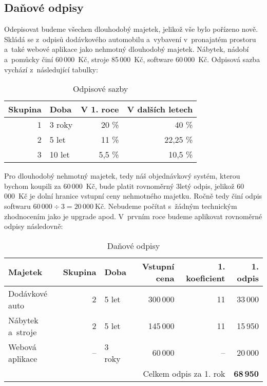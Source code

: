 \subsection{Daňové odpisy}
Odepisovat budeme všechen dlouhodobý majetek, jelikož vše bylo pořízeno nově. Skládá se z~odpisů dodávkového automobilu a~vybavení v~pronajatém prostoru a~také webové aplikace jako nehmotný dlouhodobý majetek. Nábytek, nádobí a~pomůcky činí 60\,000~Kč, stroje 85\,000~Kč, software 60\,000~Kč. Odpisová sazba vychází z~následující tabulky:

\begin{table}[htbp]
\begin{center}
\begin{tabular}{ r l r r }
\textbf{Skupina} & \textbf{Doba} & \textbf{V 1. roce} & \textbf{V dalších letech} \\ \hline
1                & 3 roky        & 20 \%              & 40 \%                     \\ 
2                & 5 let         & 11 \%              & 22,25 \%                  \\
3                & 10 let        & 5,5 \%             & 10,5 \%                    
\end{tabular}
\caption{Odpisové sazby \cite{andrejs}}
\label{odpisove_sazby}
\end{center}
\end{table}

Pro dlouhodobý nehmotný majetek, tedy náš objednávkový systém, kterou bychom koupili za 60\,000~Kč, bude platit rovnoměrný 3letý odpis, jelikož 60\,000~Kč je dolní hranice vstupní ceny nehmotného majetku. Ročně tedy činí odpis softwaru $60\,000 \div 3 = 20\,000~\text{Kč}$. Nebudeme počítat s~žádným technickým zhodnocením jako je upgrade apod. V~prvním roce budeme aplikovat rovnoměrné odpisy následovně:

\begin{table}[htbp]
\begin{center}
\begin{tabular}{lrlrrr}
\textbf{Majetek} & \textbf{Skupina}     & \textbf{Doba} & \textbf{Vstupní cena} & \textbf{1. koeficient}               & \textbf{1. odpis\index{odpis}} \\ \hline
Dodávkové auto   & 2                    & 5 let         & 300\,000               & 11                                   & 33\,000            \\
Nábytek a~stroje & 2                    & 5 let         & 145\,000               & 11                                   & 15\,950            \\
Webová aplikace  & --                   & 3 roky        & 60\,000                & --                                   & 20\,000            \\ \hline
                 & \multicolumn{1}{l}{} &               & \multicolumn{2}{r}{Celkem odpis\index{odpis} za 1. rok} & \textbf{68\,950}           
\end{tabular}
\caption{Daňové odpisy}
\label{danove_odpisy}
\end{center}
\end{table}




